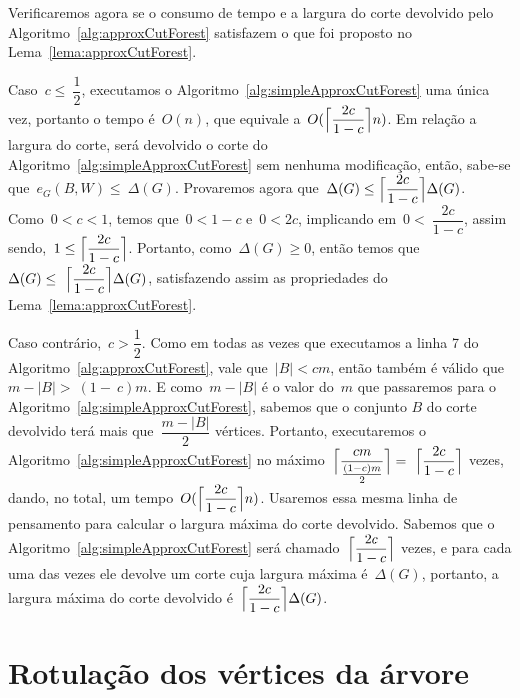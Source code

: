 \documentclass[a4paper,12pt]{article}
\DeclarePairedDelimiter\ceil{\lceil}{\rceil}
\begin{document}
	Verificaremos agora se o consumo de tempo e a largura do 
	corte devolvido pelo Algoritmo~\ref{alg:approxCutForest} satisfazem
	o que foi proposto no Lema~\ref{lema:approxCutForest}.
	
	Caso~$c\le~\dfrac{1}{2}$, executamos o
	Algoritmo~\ref{alg:simpleApproxCutForest} uma única vez, portanto
	o tempo é~$O(n)$, que equivale a~$O(\ceil[\Big]{\dfrac{2c}{1-c}} n)$.
	Em relação a largura do corte,
	será devolvido o corte do Algoritmo~\ref{alg:simpleApproxCutForest}
	sem nenhuma modificação, então, sabe-se que~$e_G(B,W)\le~\Delta(G)$.
	Provaremos agora que~$\Delta(G) \le \ceil[\Big]{ \dfrac{2c}{1-c}}\Delta(G)$.
	Como~$0<c<1$, temos que~$0<1-c$ e~$0<2c$, implicando  
	em~$0<~\dfrac{2c}{1-c}$, assim sendo,~$1\le \ceil[\Big]{ \dfrac{2c}{1-c}}$.
	Portanto, 
	como~$\Delta(G)\ge 0$, então temos 
	que~$\Delta(G)\le~\ceil[\Big]{\dfrac{2c}{1-c}}\Delta(G)$, satisfazendo
	assim as propriedades do Lema~\ref{lema:approxCutForest}.

	Caso contrário,~$c>\dfrac{1}{2}$. Como em todas as vezes que
	executamos a linha 7 do Algoritmo~\ref{alg:approxCutForest}, vale
	que~$|B|<cm$, então também é válido que~$m-|B|>~(1-~c)m$.
	E como~$m-|B|$ é o valor do~$m$ que passaremos para o 
	Algoritmo~\ref{alg:simpleApproxCutForest}, sabemos que o conjunto $B$ 
	do corte devolvido terá mais que~$\dfrac{m-|B|}{2}$ vértices.
	Portanto, executaremos o Algoritmo~\ref{alg:simpleApproxCutForest} no 
	máximo~$\ceil[\Big]{\dfrac{cm}{\frac{(1-c)m}{2}}} 
	=~\ceil[\Big]{\dfrac{2c}{1-c}}$ vezes, dando, no total, um
	tempo~$O(\ceil[\Big]{ \dfrac{2c}{1-c}} n)$.
	Usaremos essa mesma linha de pensamento para calcular o largura
	máxima do corte devolvido. Sabemos que o 
	Algoritmo~\ref{alg:simpleApproxCutForest} será 
	chamado~$\ceil[\Big]{\dfrac{2c}{1-c}}$ vezes, e para cada uma das vezes
	ele devolve um corte cuja largura máxima é~$\Delta(G)$, portanto,
	a largura máxima do corte devolvido 
	é~$\ceil[\Big]{\dfrac{2c}{1-c}}\Delta(G)$.







\newpage

\section {Rotulação dos vértices da árvore}
\end{document}
